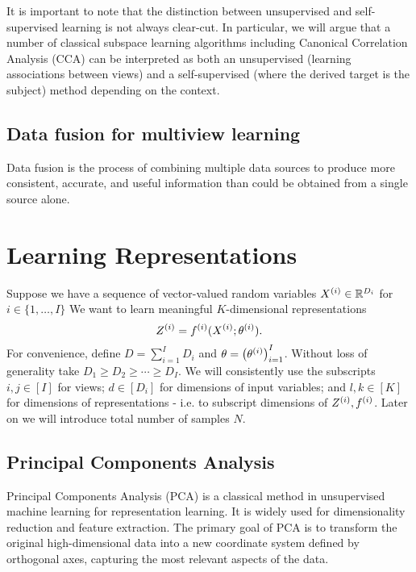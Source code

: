 It is important to note that the distinction between unsupervised and self-supervised learning is not always clear-cut.
In particular, we will argue that a number of classical subspace learning algorithms including Canonical Correlation
Analysis (CCA) can be interpreted as both an unsupervised (learning associations between views) and a self-supervised (where the derived target is the subject) method depending on the context.


\subsection{Data fusion for multiview learning}

Data fusion is the process of combining multiple data sources to produce more consistent, accurate, and useful information than could be obtained from a single source alone.



\section{Learning Representations}

Suppose we have a sequence of vector-valued random variables $X^{(i)} \in \mathbb{R}^{D_i}$ for $i \in \{1, \dots, I \}$
We want to learn meaningful $K$-dimensional representations
\begin{equation}\label{eq:general-form-of-representations}
    Z^{(i)} = f^{(i)}( X^{(i)}; \theta^{(i)}).
\end{equation}
For convenience, define $D = \sum_{i=1}^I D_i$ and $\theta = \left(\theta^{(i)}\right)_{i=1}^I$.
Without loss of generality take $D_1 \geq D_2 \geq \cdots \geq D_I$.
We will consistently use the subscripts $i,j \in [I]$ for views;
$d \in [D_i]$ for dimensions of input variables;
and $l,k \in [K]$ for dimensions of representations - i.e. to subscript dimensions of $Z^{(i)}, f^{(i)}$.
Later on we will introduce total number of samples $N$.

\subsection{Principal Components Analysis}

Principal Components Analysis (PCA)\cite{hotelling1933analysis} is a classical method in unsupervised machine learning for representation learning.
It is widely used for dimensionality reduction and feature extraction.
The primary goal of PCA is to transform the original high-dimensional data into a new coordinate system defined by orthogonal axes, capturing the most relevant aspects of the data.

